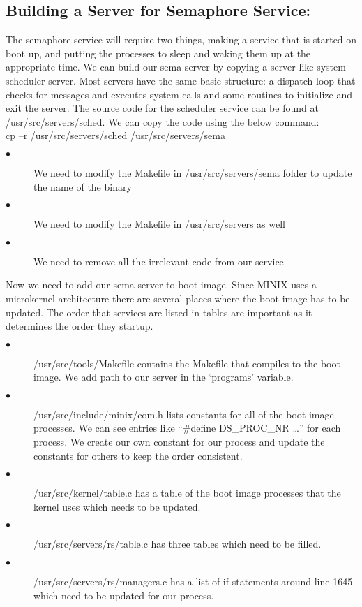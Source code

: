 \documentclass[a4paper,11pt,twocolumn]{article}
\begin{document}
\subsection{ Building a Server for Semaphore Service: }

The semaphore service will require two things, making a service that is started on boot up, and putting the processes to sleep and waking them up at the appropriate time. We can build our sema server by copying a server like system scheduler server. Most servers have the same basic structure: a dispatch loop that checks for messages and executes system calls and some routines to initialize and exit the server. The source code for the scheduler service can be found at /usr/src/servers/sched. We can copy the code using the below command:\\

cp –r /usr/src/servers/sched /usr/src/servers/sema\\

\begin{description}
  \item[$\bullet$ ] We need to modify the Makefile in /usr/src/servers/sema folder to update the name of the binary
  \item[$\bullet$ ] We need to modify the Makefile in /usr/src/servers as well
  \item[$\bullet$ ] We need to remove all the irrelevant code from our service
\end{description}
Now we need to add our sema server to boot image. Since MINIX uses a microkernel architecture there are several places where the boot image has to be updated. The order that services are listed in tables are important as it determines the order they startup.

\begin{description}
  \item[$\bullet$ ] /usr/src/tools/Makefile contains the Makefile that compiles to the boot image. We add path to our server in the ‘programs’ variable.
  \item[$\bullet$ ] /usr/src/include/minix/com.h lists constants for all of the boot image processes. We can see entries like “\#define DS\_PROC\_NR …” for each process. We create our own constant for our process and update the constants for others to keep the order consistent.
  \item[$\bullet$ ] /usr/src/kernel/table.c has a table of the boot image processes that the kernel uses which needs to be updated.
  \item[$\bullet$ ] /usr/src/servers/rs/table.c has three tables which need to be filled.
  \item[$\bullet$ ] /usr/src/servers/rs/managers.c has a list of if statements around line 1645 which need to be updated for our process.
\end{description}
\end{document}
